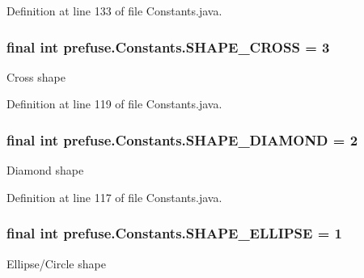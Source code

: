 \-Definition at line 133 of file \-Constants.\-java.

\hypertarget{interfaceprefuse_1_1_constants_a8630b547a7e4eb46d3d9a75247944afb}{
\subsubsection[{\-S\-H\-A\-P\-E\-\_\-\-C\-R\-O\-S\-S}]{\setlength{\rightskip}{0pt plus 5cm}final int {\bf prefuse.\-Constants.\-S\-H\-A\-P\-E\-\_\-\-C\-R\-O\-S\-S} = 3}}\label{interfaceprefuse_1_1_constants_a8630b547a7e4eb46d3d9a75247944afb}
\-Cross shape 

\-Definition at line 119 of file \-Constants.\-java.

\hypertarget{interfaceprefuse_1_1_constants_aaf1203d813d71d98b36a1fe11cb5b9e2}{
\subsubsection[{\-S\-H\-A\-P\-E\-\_\-\-D\-I\-A\-M\-O\-N\-D}]{\setlength{\rightskip}{0pt plus 5cm}final int {\bf prefuse.\-Constants.\-S\-H\-A\-P\-E\-\_\-\-D\-I\-A\-M\-O\-N\-D} = 2}}\label{interfaceprefuse_1_1_constants_aaf1203d813d71d98b36a1fe11cb5b9e2}
\-Diamond shape 

\-Definition at line 117 of file \-Constants.\-java.

\hypertarget{interfaceprefuse_1_1_constants_a3f315c282b50ee4f85fc48c02cb65b65}{
\subsubsection[{\-S\-H\-A\-P\-E\-\_\-\-E\-L\-L\-I\-P\-S\-E}]{\setlength{\rightskip}{0pt plus 5cm}final int {\bf prefuse.\-Constants.\-S\-H\-A\-P\-E\-\_\-\-E\-L\-L\-I\-P\-S\-E} = 1}}\label{interfaceprefuse_1_1_constants_a3f315c282b50ee4f85fc48c02cb65b65}
\-Ellipse/\-Circle shape 

